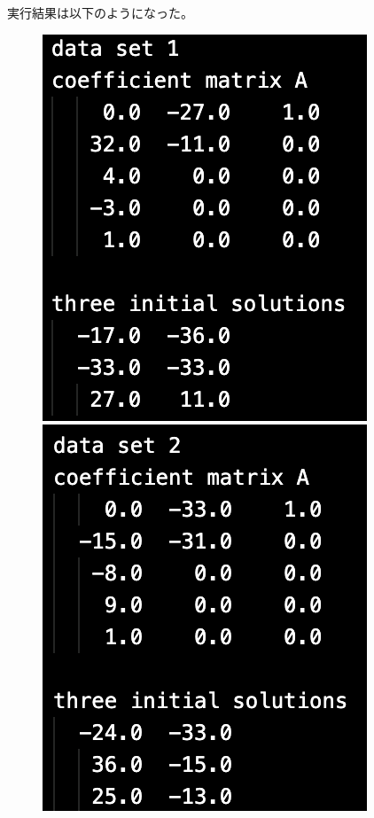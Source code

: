 \documentclass[12pt]{jarticle}
\begin{document}
実行結果は以下のようになった。
\begin{figure}[h]
    \begin{minipage}{0.3\hsize}
        \begin{center}
            \includegraphics[scale=0.35]{kadai1_2data1.png}
        \end{center}
    \end{minipage}
    \begin{minipage}{0.3\hsize}
        \begin{center}
            \includegraphics[scale=0.35]{kadai1_2data2.png}

\end{center}
\end{minipage}
\end{figure}
\end{document}
